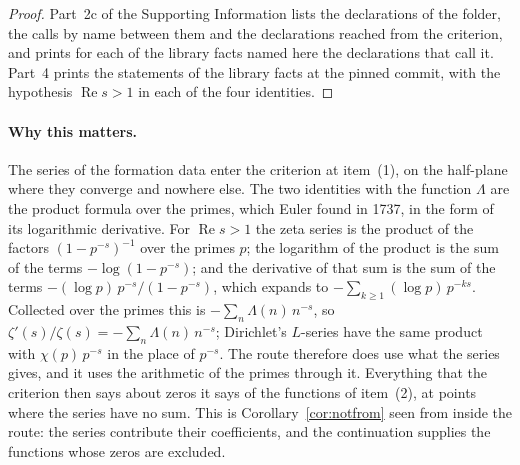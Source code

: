\documentclass[11pt]{article}
\theoremstyle{definition}
\theoremstyle{remark}
\newcommand{\re}{\operatorname{Re}}
\begin{document}
\begin{proof}
Part~2c of the Supporting Information lists the declarations of the folder, the calls by name between them and the declarations reached from the criterion, and prints for each of the library facts named here the declarations that call it. Part~4 prints the statements of the library facts at the pinned commit, with the hypothesis $\re s>1$ in each of the four identities.
\end{proof}

\paragraph{Why this matters.} The series of the formation data enter the criterion at item~(1), on the half-plane where they converge and nowhere else. The two identities with the function $\Lambda$ are the product formula over the primes, which Euler found in 1737, in the form of its logarithmic derivative. For $\re s>1$ the zeta series is the product of the factors $(1-p^{-s})^{-1}$ over the primes $p$; the logarithm of the product is the sum of the terms $-\log(1-p^{-s})$; and the derivative of that sum is the sum of the terms $-(\log p)\,p^{-s}/(1-p^{-s})$, which expands to $-\sum_{k\ge1}(\log p)\,p^{-ks}$. Collected over the primes this is $-\sum_n\Lambda(n)\,n^{-s}$, so $\zeta'(s)/\zeta(s)=-\sum_n\Lambda(n)\,n^{-s}$; Dirichlet's $L$-series have the same product with $\chi(p)\,p^{-s}$ in the place of $p^{-s}$. The route therefore does use what the series gives, and it uses the arithmetic of the primes through it. Everything that the criterion then says about zeros it says of the functions of item~(2), at points where the series have no sum. This is Corollary~\ref{cor:notfrom} seen from inside the route: the series contribute their coefficients, and the continuation supplies the functions whose zeros are excluded.
\end{document}
